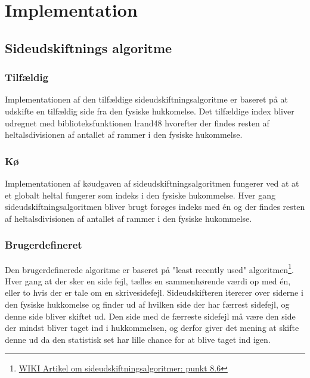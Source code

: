 \section{Implementation}
\subsection{Sideudskiftnings algoritme}
\subsubsection{Tilfældig}
Implementationen af den tilfældige sideudskiftningsalgoritme er baseret på at udskifte en tilfældig side fra den fysiske hukkomelse. Det tilfældige index bliver udregnet med biblioteksfunktionen lrand48 hvorefter der findes resten af heltalsdivisionen af antallet af rammer i den fysiske hukommelse.

\subsubsection{Kø}
Implementationen af køudgaven af sideudskiftningsalgoritmen fungerer ved at at et globalt heltal fungerer som indeks i den fysiske hukommelse. Hver gang sideudskiftningsalgoritmen bliver brugt forøges indeks med én og der findes resten af heltalsdivisionen af antallet af rammer i den fysiske hukommelse.

\subsubsection{Brugerdefineret}
Den brugerdefinerede algoritme er baseret på "least recently used" algoritmen\footnote{\href{https://en.wikipedia.org/wiki/Page_replacement_algorithm}{WIKI Artikel om sideudskiftningsalgoritmer: punkt 8.6}}. Hver gang at der sker en side fejl, tælles en sammenhørende værdi op med én, eller to hvis der er tale om en skrivesidefejl. Sideudskifteren itererer over siderne i den fysiske hukkomelse og finder ud af hvilken side der har færrest sidefejl, og denne side bliver skiftet ud. Den side med de færreste sidefejl må være den side der mindst bliver taget ind i hukkommelsen, og derfor giver det mening at skifte denne ud da den statistisk set har lille chance for at blive taget ind igen.